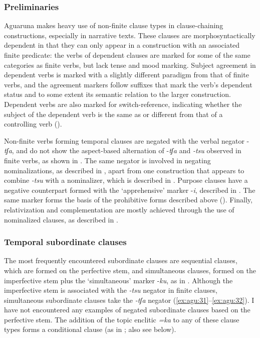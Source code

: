 \documentclass[output=paper,colorlinks,citecolor=brown,draft]{langscibook}
\begin{document}
\subsubsection{Preliminaries}
Aguaruna makes heavy use of non-finite clause types in clause-chaining constructions, especially in narrative texts. These clauses are morphosyntactically dependent in that they can only appear in a construction with an associated finite predicate: the verbs of dependent clauses are marked for some of the same categories as finite verbs, but lack tense and mood marking. Subject agreement in dependent verbs is marked with a slightly different paradigm from that of finite verbs, and the agreement markers follow suffixes that mark the verb’s dependent status and to some extent its semantic relation to the larger construction. Dependent verbs are also marked for switch-reference, indicating whether the subject of the dependent verb is the same as or different from that of a controlling verb (\citealt{HaimanMunro1983}).

Non-finite verbs forming temporal clauses are negated with the verbal negator \nobreakdash-\textit{tʃa}, and do not show the aspect-based alternation of \nobreakdash-\textit{tʃa} and \textit{\nobreakdash-tsu} observed in finite verbs, as shown in . The same negator is involved in negating nominalizations, as described in , apart from one construction that appears to combine \textit{\nobreakdash-tsu} with a nominalizer, which is described in . Purpose clauses have a negative counterpart formed with the ‘apprehensive’ marker \nobreakdash-\textit{i}, described in . The same marker forms the basis of the prohibitive forms described above (). Finally, relativization and complementation are mostly achieved through the use of nominalized clauses, as described in .

\subsubsection{Temporal subordinate clauses}\label{sec:agu:2.4.1}

The most frequently encountered subordinate clauses are sequential clauses, which are formed  on the perfective stem, and simultaneous clauses, formed on the imperfective stem plus the ‘simultaneous’ marker \nobreakdash-\textit{ku}, as in . Although the imperfective stem is associated with the \textit{\nobreakdash-tsu} negator in finite clauses, simultaneous subordinate clauses take the \textit{{}-tʃa} negator (\ref{ex:agu:31}--\ref{ex:agu:32}). I have not encountered any examples of negated subordinate clauses based on the perfective stem. The addition of the topic enclitic \textit{=ka} to any of these clause types forms a conditional clause (as in ; also see  below).
\end{document}
